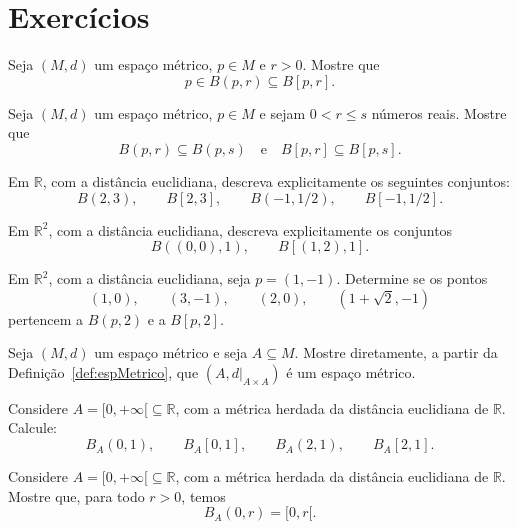 \section*{Exercícios}

\begin{exercise}
    Seja $(M,d)$ um espaço métrico, $p\in M$ e $r>0$.
    Mostre que
    \[
        p\in B(p,r)\subseteq B[p,r].
    \]
\end{exercise}

\begin{exercise}
    Seja $(M,d)$ um espaço métrico, $p\in M$ e sejam $0<r\leq s$ números reais.
    Mostre que
    \[
        B(p,r)\subseteq B(p,s)
        \quad\text{e}\quad
        B[p,r]\subseteq B[p,s].
    \]
\end{exercise}

\begin{exercise}
    Em $\mathbb R$, com a distância euclidiana, descreva explicitamente os seguintes conjuntos:
    \[
        B(2,3),\qquad B[2,3],\qquad B(-1,1/2),\qquad B[-1,1/2].
    \]
\end{exercise}

\begin{exercise}
    Em $\mathbb R^2$, com a distância euclidiana, descreva explicitamente os conjuntos
    \[
        B((0,0),1),\qquad B[(1,2),1].
    \]
\end{exercise}

\begin{exercise}
    Em $\mathbb R^2$, com a distância euclidiana, seja $p=(1,-1)$.
    Determine se os pontos
    \[
        (1,0),\qquad (3,-1),\qquad (2,0),\qquad (1+\sqrt2,-1)
    \]
    pertencem a $B(p,2)$ e a $B[p,2]$.
\end{exercise}

\begin{exercise}\label{ex:subespacoEspacoMetrico}
    Seja $(M,d)$ um espaço métrico e seja $A\subseteq M$.
    Mostre diretamente, a partir da Definição~\ref{def:espMetrico}, que $(A,d|_{A\times A})$ é um espaço métrico.
\end{exercise}

\begin{exercise}
    Considere $A=[0,+\infty[\subseteq\mathbb R$, com a métrica herdada da distância euclidiana de $\mathbb R$.
    Calcule:
    \[
        B_A(0,1),\qquad B_A[0,1],\qquad B_A(2,1),\qquad B_A[2,1].
    \]
\end{exercise}

\begin{exercise}
    Considere $A=[0,+\infty[\subseteq\mathbb R$, com a métrica herdada da distância euclidiana de $\mathbb R$.
    Mostre que, para todo $r>0$, temos
    \[
        B_A(0,r)=[0,r[.
    \]
\end{exercise}

